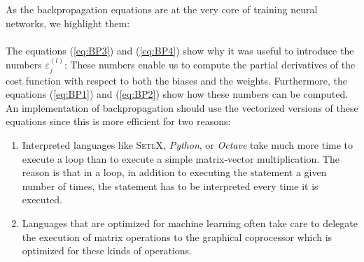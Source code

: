 As the backpropagation equations are at the very core of training neural networks, we highlight them:
\\[0.2cm]
\hspace*{0.3cm}
\colorbox{red}{}
\\[0.2cm]
The equations (\ref{eq:BP3}) and (\ref{eq:BP4}) show why it was useful to introduce the
numbers $\varepsilon_j^{(l)}$: These numbers enable us to compute the partial derivatives of the cost function
with respect to both the biases and the weights.  Furthermore, the equations (\ref{eq:BP1}) and (\ref{eq:BP2})
show how these numbers can be computed.  An implementation of backpropagation should use the vectorized
versions of these equations since this is more efficient for two reasons:
\begin{enumerate}
\item Interpreted languages like \textsc{SetlX}, \textsl{Python}, or \textsl{Octave} take much more time to
      execute a loop than to execute a simple matrix-vector multiplication.  The reason is that in a loop, in
      addition to executing the statement a given number of times, the statement has to be interpreted 
      every time it is executed.
\item Languages that are optimized for machine learning often take care to delegate the execution of matrix
      operations to the graphical coprocessor which is optimized for these kinds of operations.  
\end{enumerate}

